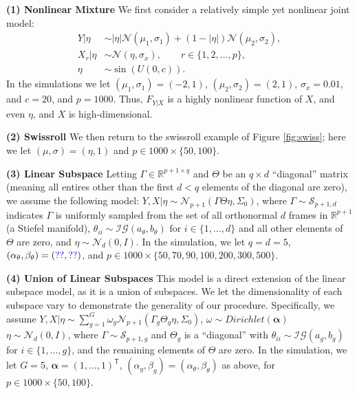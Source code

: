 \documentclass{article} %
\newcommand{\Real}{\mathbb{R}}
\providecommand{\mb}[1]{\boldsymbol{#1}}
\providecommand{\mc}[1]{\mathcal{#1}}
\newcommand{\T}{^{\ensuremath{\mathsf{T}}}}           %
\newcommand{\dd}[1]{{\color{blue}{\it #1}}}
\begin{document}
\textbf{(1) Nonlinear Mixture}
%
We first consider a relatively simple yet nonlinear joint model:
\begin{subequations}
\begin{align}
	Y|\eta &\sim   |\eta| \mc{N}(\mu_1,\sigma_1) + (1-|\eta|) \mc{N}(\mu_2,\sigma_2), \\
	X_r|\eta  &\sim \mc{N}(\eta, \sigma_x), \qquad r \in \{1, 2, \ldots, p\}, \\
	\eta  &\sim \sin(U(0,c)). %
\end{align}
\end{subequations}
In the simulations we let $(\mu_1,\sigma_1)=(-2,1)$, $(\mu_2,\sigma_2)=(2,1)$, $\sigma_x=0.01$, and $c=20$, and $p=1000$. Thus, $F_{Y|X}$ is a highly nonlinear function of $X$, and even $\eta$, and $X$ is high-dimensional.  

\textbf{(2) Swissroll} 
% 
We then return to the swissroll example of Figure \ref{fig:swiss}; here we let $(\mu,\sigma)=(\eta,1)$ and   $p \in 1000 \times \{50, 100\}$.

\textbf{(3) Linear Subspace} Letting $\Gamma \in \Real^{p+1 \times q}$ and $\Theta$ be an ${q \times d}$ ``diagonal'' matrix (meaning all entires other than the first $d < q$ elements of the diagonal are zero), we assume the following model:
	$Y,X |\eta \sim \mc{N}_{p+1}(\Gamma \Theta \eta ,\Sigma_0)$,
	where 	$\Gamma \sim \mc{S}_{p+1,d}$ indicates $\Gamma$ is uniformly sampled from the set of all orthonormal $d$ frames in $\Real^{p+1}$ (a Stiefel manifold), 
	$\theta_{ii} \sim \mc{IG}(a_\theta,b_\theta) \text{ for } i \in \{1, \ldots, d\}$ and all other elements of $\Theta$ are zero, and $\eta  \sim \mc{N}_d(0, I)$.  In the simulation, we let $q=d=5$,   $(\alpha_\theta,\beta_\theta)=(\dd{??},\dd{??})$, and $p \in 1000 \times \{50, 70, 90, 100, 200, 300, 500\}$.


\textbf{(4) Union of Linear Subspaces}
This model is a direct extension of the linear subspace model, as it is a union of subspaces. We let the dimensionality of each subspace vary to demonstrate the generality of our procedure.  Specifically, we assume 	$Y,X |\eta \sim \sum_{g=1}^G \omega_g \mc{N}_{p+1}(\Gamma_g \Theta_g \eta ,\Sigma_0)$, $\omega \sim Dirichlet(\mb{\alpha})$ 
	$\eta \sim \mc{N}_d(0, I)$, 
where $\Gamma \sim \mc{S}_{p+1,g}$ and $\Theta_g$ is a ``diagonal'' with $\theta_{ii} \sim \mc{IG}(a_g,b_g)$ for  $i \in \{1, \ldots, g\}$, and the remaining elements of $\Theta$ are zero.
In the simulation, we let $G=5$,  $\mb{\alpha}=(1, \ldots, 1)\T$,  $(\alpha_g,\beta_g)=(\alpha_\theta,\beta_\theta)$ as above, for  $p \in 1000 \times \{50, 100\}$.
  
\end{document}
